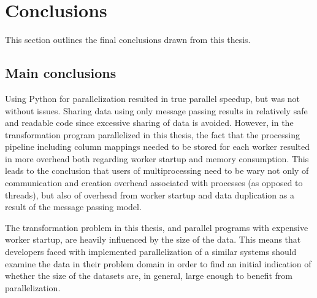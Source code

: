 

\section{Conclusions}
This section outlines the final conclusions drawn from this thesis.

\subsection{Main conclusions}
Using Python  for parallelization resulted in true parallel speedup, but was not without issues.
Sharing data using only message passing results in relatively safe and readable code since excessive sharing of data is avoided.
However, in the transformation program parallelized in this thesis, the fact that the processing pipeline including column mappings
needed to be stored for each worker resulted in more overhead both regarding worker startup and memory consumption. This
leads to the conclusion that users of multiprocessing need to be wary not only of communication and creation overhead associated
with processes (as opposed to threads), but also of overhead from worker startup and data duplication as a result of the message
passing model.

The transformation problem in this thesis, and parallel programs with expensive worker startup, are heavily influenced by the size
of the data. This means that developers faced with implemented parallelization of a similar systems should examine the data in their
problem domain in order to find an initial indication of whether the size of the datasets are, in general, large enough to benefit
from parallelization.

